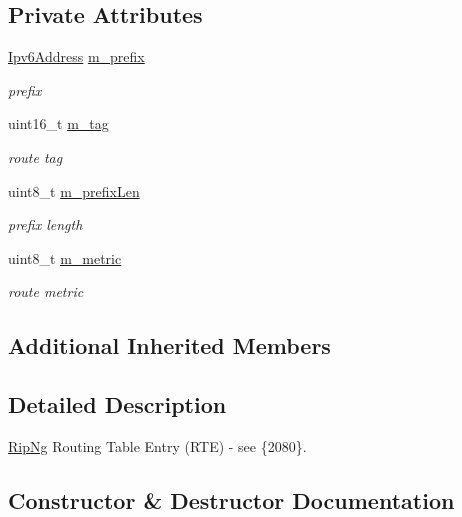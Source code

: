 \subsection*{Private Attributes}
\begin{DoxyCompactItemize}
\item 
\hyperlink{classns3_1_1Ipv6Address}{Ipv6\+Address} \hyperlink{classns3_1_1RipNgRte_a09ae226e8d0712bbe7803b9bede0cf84}{m\+\_\+prefix}
\begin{DoxyCompactList}\small\item\em prefix \end{DoxyCompactList}\item 
uint16\+\_\+t \hyperlink{classns3_1_1RipNgRte_a02e9a9a0a844f09441d19418c434acf6}{m\+\_\+tag}
\begin{DoxyCompactList}\small\item\em route tag \end{DoxyCompactList}\item 
uint8\+\_\+t \hyperlink{classns3_1_1RipNgRte_a39a5934e2e8344da996921c744daf2e9}{m\+\_\+prefix\+Len}
\begin{DoxyCompactList}\small\item\em prefix length \end{DoxyCompactList}\item 
uint8\+\_\+t \hyperlink{classns3_1_1RipNgRte_a094b76991347ede6defef62080acb458}{m\+\_\+metric}
\begin{DoxyCompactList}\small\item\em route metric \end{DoxyCompactList}\end{DoxyCompactItemize}
\subsection*{Additional Inherited Members}


\subsection{Detailed Description}
\hyperlink{classns3_1_1RipNg}{Rip\+Ng} Routing Table Entry (R\+TE) -\/ see \{2080\}. 

\subsection{Constructor \& Destructor Documentation}
